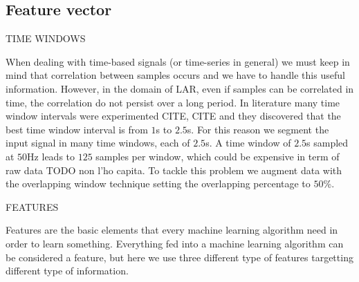 \subsection{Feature vector}
\label{subsec:feature-vector}

TIME WINDOWS

When dealing with time-based signals (or time-series in general) we
must keep in mind that correlation between samples occurs and we have
to handle this useful information. However, in the domain of LAR, even
if samples can be correlated in time, the correlation do not persist
over a long period. In literature many time window intervals were
experimented CITE, CITE and they discovered that the best time window
interval is from $1$s to $2.5$s. For this reason we segment the input
signal in many time windows, each of $2.5$s. A time window of $2.5$s
sampled at $50$Hz leads to $125$ samples per window, which could be
expensive in term of raw data TODO non l'ho capita. To tackle this problem we augment
data with the overlapping window technique setting the overlapping
percentage to $50$\%.

FEATURES

Features are the basic elements that every machine learning algorithm
need in order to learn something. Everything fed into a machine
learning algorithm can be considered a feature, but here we use three different type of features targetting different type of information.

